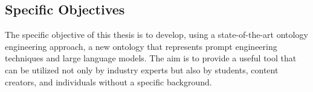 \subsection{Specific Objectives}
The specific objective of this thesis is to develop, using a state-of-the-art ontology engineering approach, a new ontology that represents prompt engineering techniques and large language models. The aim is to provide a useful tool that can be utilized not only by industry experts but also by students, content creators, and individuals without a specific background.